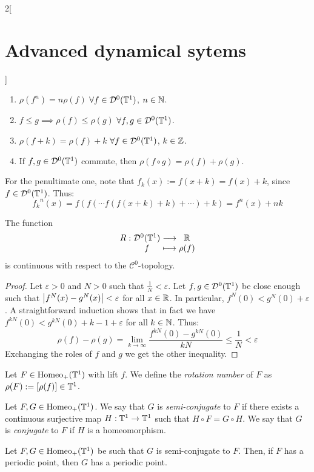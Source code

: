 \documentclass[../../../main_math.tex]{subfiles}
\begin{document}
\begin{multicols}{2}[\section{Advanced dynamical sytems}]
\begin{proposition}
\begin{enumerate}
      \item $\rho(f^n)=n\rho(f)$ $\forall f\in \mathcal{D}^0(\mathbb{T}^1)$, $n\in\mathbb{N}$.
      \item $f\leq g\implies \rho(f)\leq \rho(g)$ $\forall f,g\in \mathcal{D}^0(\mathbb{T}^1)$.
      \item $\rho(f+k)=\rho(f) + k$ $\forall f\in \mathcal{D}^0(\mathbb{T}^1)$, $k\in\mathbb{Z}$.
      \item If $f,g\in \mathcal{D}^0(\mathbb{T}^1)$ commute, then $\rho(f\circ g)=\rho(f)+\rho(g)$.
    \end{enumerate}
  \end{proposition}
  \begin{sproof}
    For the penultimate one, note that $f_k(x):=f(x+k)=f(x)+k$, since $f\in \mathcal{D}^0(\mathbb{T}^1)$. Thus:
    $$
      {f_k}^n(x)=f(f(\cdots f(f(x+k)+k)+\cdots )+k)=f^n(x)+nk
    $$
  \end{sproof}
  \begin{proposition}
    The function
    $$
      \function{R}{\mathcal{D}^0(\TT^1)}{\RR}{f}{\rho(f)}
    $$
    is continuous with respect to the $\mathcal{C}^0$-topology.
  \end{proposition}
  \begin{proof}
    Let $\varepsilon >0$ and $N>0$ such that $\frac{1}{N}<\varepsilon$. Let $f,g\in \mathcal{D}^0(\mathbb{T}^1)$ be close enough such that $\abs{f^N(x) - g^N(x)}<\varepsilon$ for all $x\in\mathbb{R}$. In particular, $f^N(0)< g^N(0)+\varepsilon$. A straightforward induction shows that in fact we have $f^{kN}(0)< g^{kN}(0)+k-1+\varepsilon$ for all $k\in\mathbb{N}$. Thus:
    $$
      \rho(f)-\rho(g)=\lim_{k\to\infty}\frac{f^{kN}(0)-g^{kN}(0)}{kN}\leq \frac{1}{N}<\varepsilon
    $$
    Exchanging the roles of $f$ and $g$ we get the other inequality.
  \end{proof}
  \begin{definition}
    Let $F\in \mathrm{Homeo}_+(\mathbb{T}^1)$ with lift $f$. We define the \emph{rotation number} of $F$ as $\rho(F):=[\rho(f)]\in \mathbb{T}^1$.
  \end{definition}
  \begin{definition}
    Let $F,G\in\mathrm{Homeo}_+(\mathbb{T}^1)$. We say that $G$ is \emph{semi-conjugate} to $F$ if there exists a continuous surjective map $H:\mathbb{T}^1\to \mathbb{T}^1$ such that $H\circ F=G\circ H$. We say that $G$ is \emph{conjugate} to $F$ if $H$ is a homeomorphism.
  \end{definition}
  \begin{lemma}
    Let $F,G\in\mathrm{Homeo}_+(\mathbb{T}^1)$ be such that $G$ is semi-conjugate to $F$. Then, if $F$ has a periodic point, then $G$ has a periodic point.

\end{lemma}
\end{multicols}
\end{document}
